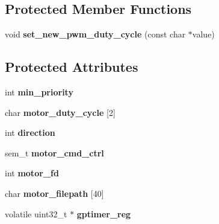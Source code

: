 \subsection*{Protected Member Functions}
\begin{DoxyCompactItemize}
\item 
\hypertarget{classMotor_af6301006bc0b18d6a4b32d2be0cd93a7}{void {\bfseries set\-\_\-new\-\_\-pwm\-\_\-duty\-\_\-cycle} (const char $\ast$value)}\label{classMotor_af6301006bc0b18d6a4b32d2be0cd93a7}

\end{DoxyCompactItemize}
\subsection*{Protected Attributes}
\begin{DoxyCompactItemize}
\item 
\hypertarget{classMotor_a0125717053068acb08b430d820bfc413}{int {\bfseries min\-\_\-priority}}\label{classMotor_a0125717053068acb08b430d820bfc413}

\item 
\hypertarget{classMotor_aac6cb55808e4f1da0506d0cc6c314e41}{char {\bfseries motor\-\_\-duty\-\_\-cycle} \mbox{[}2\mbox{]}}\label{classMotor_aac6cb55808e4f1da0506d0cc6c314e41}

\item 
\hypertarget{classMotor_a7d7c98b5afa45656905708e54ff7fb9a}{int {\bfseries direction}}\label{classMotor_a7d7c98b5afa45656905708e54ff7fb9a}

\item 
\hypertarget{classMotor_a827a1d2b453a804d389cdafbf0685022}{sem\-\_\-t {\bfseries motor\-\_\-cmd\-\_\-ctrl}}\label{classMotor_a827a1d2b453a804d389cdafbf0685022}

\item 
\hypertarget{classMotor_acb2ac1bd2630b05c40a64154a87ea65d}{int {\bfseries motor\-\_\-fd}}\label{classMotor_acb2ac1bd2630b05c40a64154a87ea65d}

\item 
\hypertarget{classMotor_aed42ebef60a1374fc86dd2aff59af85e}{char {\bfseries motor\-\_\-filepath} \mbox{[}40\mbox{]}}\label{classMotor_aed42ebef60a1374fc86dd2aff59af85e}

\item 
\hypertarget{classMotor_aac1493320f015375f125a59b6428c5d3}{volatile uint32\-\_\-t $\ast$ {\bfseries gptimer\-\_\-reg}}\label{classMotor_aac1493320f015375f125a59b6428c5d3}

\end{DoxyCompactItemize}
